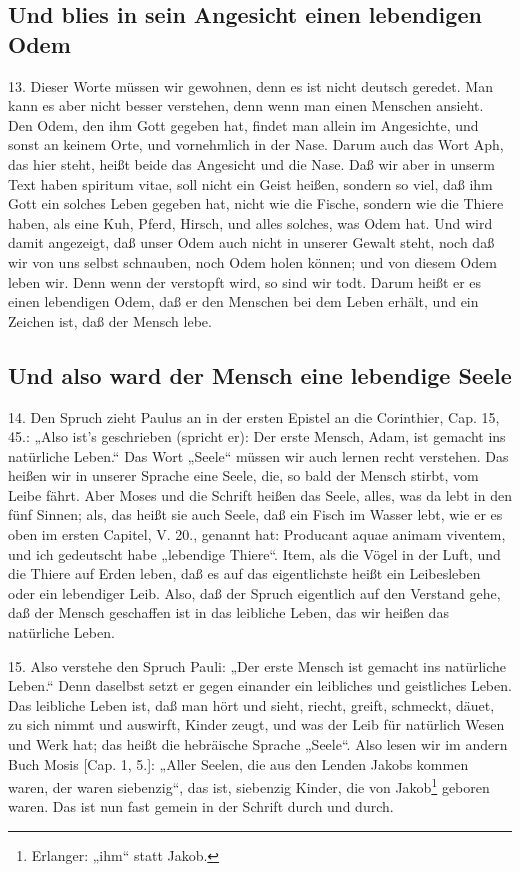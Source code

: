 \subsection{Und blies in sein Angesicht einen lebendigen Odem}

13. Dieser Worte müssen wir gewohnen, denn es ist nicht deutsch geredet. Man kann es aber nicht besser verstehen, denn wenn man einen Menschen ansieht. Den Odem, den ihm Gott gegeben hat, findet man allein im Angesichte, und sonst an keinem Orte, und vornehmlich in der Nase. Darum auch das Wort Aph, das hier steht, heißt beide das Angesicht und die Nase. Daß wir aber in unserm Text haben spiritum vitae, soll nicht ein Geist heißen, sondern so viel, daß ihm Gott ein solches Leben gegeben hat, nicht wie die Fische, sondern wie die Thiere haben, als eine Kuh, Pferd, Hirsch, und alles solches, was Odem hat. Und wird damit angezeigt, daß unser Odem auch nicht in unserer Gewalt steht, noch daß wir von uns selbst schnauben, noch Odem holen können; und von diesem Odem leben wir. Denn wenn der verstopft wird, so sind wir todt. Darum heißt er es einen lebendigen Odem, daß er den Menschen bei dem Leben erhält, und ein Zeichen ist, daß der Mensch lebe.

\subsection{Und also ward der Mensch eine lebendige Seele}

14. Den Spruch zieht Paulus an in der ersten Epistel an die Corinthier, Cap. 15, 45.: „Also
ist's geschrieben (spricht er): Der erste Mensch, Adam, ist gemacht ins natürliche Leben.“ Das Wort „Seele“ müssen wir auch lernen recht verstehen. Das heißen wir in unserer Sprache eine Seele, die, so bald der Mensch stirbt, vom Leibe fährt. Aber Moses und die Schrift heißen das Seele, alles, was da lebt in den fünf Sinnen; als, das heißt sie auch Seele, daß ein Fisch im Wasser lebt, wie er es oben im ersten Capitel, V. 20., genannt hat: Producant aquae animam viventem, und ich gedeutscht habe „lebendige Thiere“. Item, als die Vögel in der Luft, und die Thiere auf Erden leben, daß es auf das eigentlichste heißt ein Leibesleben oder ein lebendiger Leib. Also, daß der Spruch eigentlich auf den Verstand gehe, daß der Mensch geschaffen ist in das leibliche Leben, das wir heißen das natürliche Leben.

15. Also verstehe den Spruch Pauli: „Der erste Mensch ist gemacht ins natürliche Leben.“ Denn daselbst setzt er gegen einander ein leibliches und geistliches Leben. Das leibliche Leben ist, daß man hört und sieht, riecht, greift, schmeckt, däuet, zu sich nimmt und auswirft, Kinder zeugt, und was der Leib für natürlich Wesen und Werk hat; das heißt die hebräische Sprache „Seele“. Also lesen wir im andern Buch Mosis [Cap. 1, 5.]: „Aller Seelen, die aus den Lenden Jakobs kommen waren, der waren siebenzig“, das ist, siebenzig Kinder, die von Jakob\footnote{Erlanger: „ihm“ statt Jakob.} geboren waren. Das ist nun fast gemein in der Schrift durch und durch.

